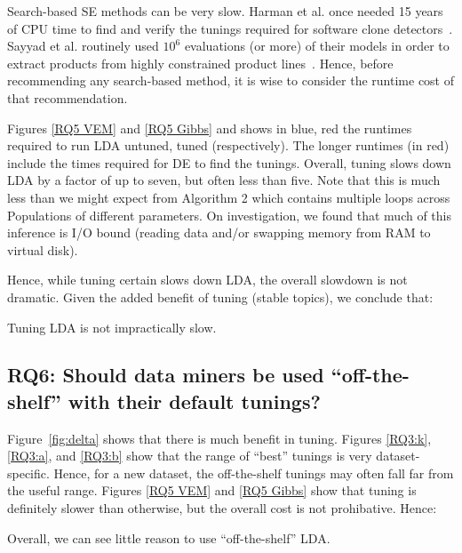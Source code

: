 \documentclass[10pt,conference]{IEEEtran}
\theoremstyle{break}
\begin{document}
Search-based SE methods can be very slow. Harman et al. once needed 15 years of CPU time to find and verify
the tunings required for software clone detectors~\cite{wang2013searching}. Sayyad et al. routinely used $10^6$ evaluations (or more)
  of their models in order to extract products from highly constrained product lines~\cite{sayyad2013scalable}. Hence, before recommending
  any search-based method, it is wise to consider the runtime cost of that recommendation.

  Figures \ref{RQ5 VEM} and \ref{RQ5 Gibbs} and  shows in blue, red the runtimes required to run LDA untuned, tuned (respectively).
  The longer runtimes (in red) include the times required for DE to find the tunings. Overall, tuning slows down LDA by a factor of up to seven,
  but often less than five. Note that this is much less than we might expect from Algorithm 2 which contains multiple loops across Populations of different parameters.
  On investigation, we found that much of this inference is I/O bound (reading data and/or swapping memory from RAM to virtual disk).

  Hence, while tuning certain slows down LDA, the overall slowdown is not dramatic. Given the added benefit of tuning (stable topics),
  we conclude that:

  \begin{lesson}
    Tuning LDA is not impractically slow.
\end{lesson}


\subsection{\textbf{RQ6: Should data miners be used “off-the-shelf” with their  default  tunings?}}


  Figure~\ref{fig:delta} shows that there is much benefit in tuning.
  Figures \ref{RQ3:k}, \ref{RQ3:a}, and \ref{RQ3:b} show that
  the range of ``best'' tunings is very dataset-specific. Hence, for a new dataset,
  the off-the-shelf tunings
  may often fall far from the useful range.
  Figures \ref{RQ5 VEM} and \ref{RQ5 Gibbs} show that tuning is definitely
  slower than otherwise, but the overall cost is not prohibative.
  Hence:
  \begin{lesson}
    Overall, we can see little reason  to use ``off-the-shelf'' LDA.
    \end{lesson}
  
 
\end{document}
